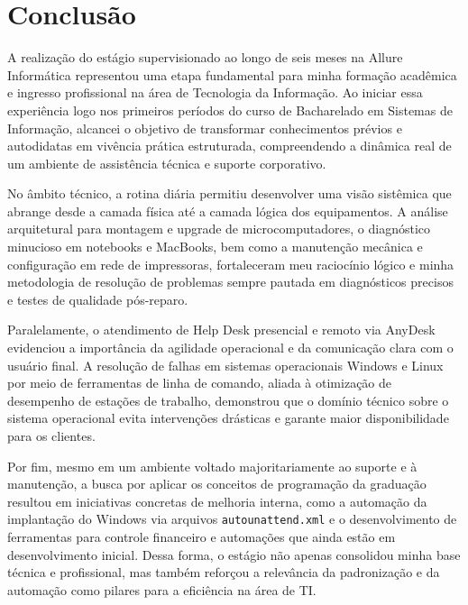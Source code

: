\documentclass[12pt,openany,oneside,a4paper,brazil]{abntex2}
\begin{document}
\chapter{Conclusão}

\indent A realização do estágio supervisionado ao longo de seis meses na Allure Informática representou uma etapa fundamental para minha formação acadêmica e ingresso profissional na área de Tecnologia da Informação. Ao iniciar essa experiência logo nos primeiros períodos do curso de Bacharelado em Sistemas de Informação, alcancei o objetivo de transformar conhecimentos prévios e autodidatas em vivência prática estruturada, compreendendo a dinâmica real de um ambiente de assistência técnica e suporte corporativo.

No âmbito técnico, a rotina diária permitiu desenvolver uma visão sistêmica que abrange desde a camada física até a camada lógica dos equipamentos. A análise arquitetural para montagem e upgrade de microcomputadores, o diagnóstico minucioso em notebooks e MacBooks, bem como a manutenção mecânica e configuração em rede de impressoras, fortaleceram meu raciocínio lógico e minha metodologia de resolução de problemas sempre pautada em diagnósticos precisos e testes de qualidade pós-reparo.

Paralelamente, o atendimento de Help Desk presencial e remoto via AnyDesk evidenciou a importância da agilidade operacional e da comunicação clara com o usuário final. A resolução de falhas em sistemas operacionais Windows e Linux por meio de ferramentas de linha de comando, aliada à otimização de desempenho de estações de trabalho, demonstrou que o domínio técnico sobre o sistema operacional evita intervenções drásticas e garante maior disponibilidade para os clientes.

Por fim, mesmo em um ambiente voltado majoritariamente ao suporte e à manutenção, a busca por aplicar os conceitos de programação da graduação resultou em iniciativas concretas de melhoria interna, como a automação da implantação do Windows via arquivos \texttt{autounattend.xml} e o desenvolvimento de ferramentas para controle financeiro e automações que ainda estão em desenvolvimento inicial. Dessa forma, o estágio não apenas consolidou minha base técnica e profissional, mas também reforçou a relevância da padronização e da automação como pilares para a eficiência na área de TI.
\postextual
\nocite{microsoft_unattend,anydesk2026,abntex2_2018}

\end{document}
